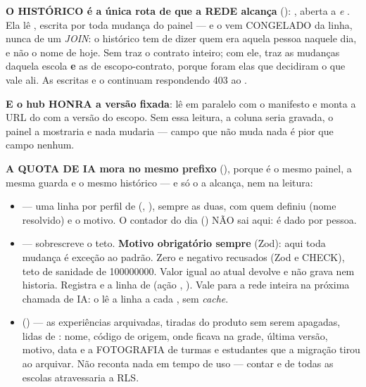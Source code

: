 \textbf{O HISTÓRICO é a única rota de  que a REDE alcança}
(): , aberta a  \emph{e}
. Ela lê , escrita por toda mudança
do painel --- e o  vem CONGELADO da linha, nunca de um
\emph{JOIN}: o histórico tem de dizer quem era aquela pessoa naquele dia, e não
o nome de hoje. Sem  traz o contrato inteiro; com ele, traz as
mudanças daquela escola \textbf{e} as de escopo-contrato, porque foram elas que
decidiram o que vale ali. As escritas e o  continuam
respondendo 403 ao .

\textbf{E o hub HONRA a versão fixada}:  lê
 em paralelo com o manifesto e monta a URL do
 com a versão do escopo. Sem essa leitura, a coluna seria gravada, o
painel a mostraria e nada mudaria --- campo que não muda nada é pior que campo
nenhum.

\textbf{A QUOTA DE IA mora no mesmo prefixo} (), porque é o mesmo
painel, a mesma guarda e o mesmo histórico --- e só o  a alcança, nem
na leitura:

\begin{itemize}
  \item {} --- uma linha por perfil de
     (, ), sempre as duas, com quem
    definiu (nome resolvido) e o motivo. O contador do dia
    () NÃO sai aqui: é dado por pessoa.
  \item {} --- sobrescreve o teto.
    \textbf{Motivo obrigatório sempre} (Zod): aqui toda mudança é exceção ao
    padrão. Zero e negativo recusados (Zod e CHECK), teto de sanidade de
    \num{100000000}. Valor igual ao atual devolve  e não
    grava nem historia. Registra  e a linha de
     (ação , ). Vale para a rede inteira na próxima chamada de IA: o
     lê a linha a cada , sem \emph{cache}.
  \item {} () --- as experiências
    arquivadas, tiradas do produto sem serem apagadas, lidas de
    : nome, código de origem, onde ficava na grade,
    última versão, motivo, data e a FOTOGRAFIA de turmas e estudantes que a
    migração tirou ao arquivar. Não reconta nada em tempo de uso --- contar
     e  de todas as escolas atravessaria a RLS.
\end{itemize}

